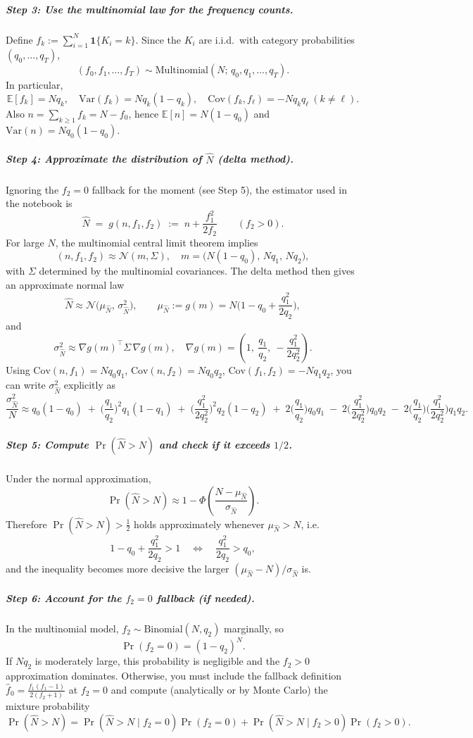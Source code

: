 \documentclass[11pt]{article}
\begin{document}
\subparagraph{Step 3: Use the multinomial law for the frequency counts.}
Define $f_k:=\sum_{i=1}^N \mathbf{1}\{K_i=k\}$. Since the $K_i$ are i.i.d.\ with category probabilities $(q_0,\dots,q_T)$,
\[
(f_0,f_1,\dots,f_T)\sim \mathrm{Multinomial}\!\left(N;\,q_0,q_1,\dots,q_T\right).
\]
In particular,
\[
\mathbb{E}[f_k]=Nq_k,\quad
\mathrm{Var}(f_k)=Nq_k(1-q_k),\quad
\mathrm{Cov}(f_k,f_\ell)=-Nq_kq_\ell\ (k\neq \ell).
\]
Also $n=\sum_{k\ge 1} f_k = N-f_0$, hence $\mathbb{E}[n]=N(1-q_0)$ and $\mathrm{Var}(n)=Nq_0(1-q_0)$.

\subparagraph{Step 4: Approximate the distribution of $\hat N$ (delta method).}
Ignoring the $f_2=0$ fallback for the moment (see Step 5), the estimator used in the notebook is
\[
\hat N \;=\; g(n,f_1,f_2)
\;:=\;
n+\frac{f_1^2}{2f_2}\qquad(f_2>0).
\]
For large $N$, the multinomial central limit theorem implies
\[
(n,f_1,f_2)\approx \mathcal N(m,\Sigma),
\quad
m=\big(N(1-q_0),\,Nq_1,\,Nq_2\big),
\]
with $\Sigma$ determined by the multinomial covariances. The delta method then gives an approximate normal law
\[
\hat N \approx \mathcal N\!\big(\mu_{\hat N},\,\sigma_{\hat N}^2\big),
\qquad
\mu_{\hat N}:=g(m)=N\Big(1-q_0+\frac{q_1^2}{2q_2}\Big),
\]
and
\[
\sigma_{\hat N}^2 \approx \nabla g(m)^\top \Sigma\,\nabla g(m),
\quad
\nabla g(m)=\left(1,\ \frac{q_1}{q_2},\ -\frac{q_1^2}{2q_2^2}\right).
\]
Using $\mathrm{Cov}(n,f_1)=Nq_0q_1$, $\mathrm{Cov}(n,f_2)=Nq_0q_2$, $\mathrm{Cov}(f_1,f_2)=-Nq_1q_2$, you can write $\sigma_{\hat N}^2$ explicitly as
\[
\frac{\sigma_{\hat N}^2}{N}\approx
q_0(1-q_0)
\;+\;\Big(\frac{q_1}{q_2}\Big)^2 q_1(1-q_1)
\;+\;\Big(\frac{q_1^2}{2q_2^2}\Big)^2 q_2(1-q_2)
\;+\;2\Big(\frac{q_1}{q_2}\Big)q_0q_1
\;-\;2\Big(\frac{q_1^2}{2q_2^2}\Big)q_0q_2
\;-\;2\Big(\frac{q_1}{q_2}\Big)\Big(\frac{q_1^2}{2q_2^2}\Big)q_1q_2.
\]

\subparagraph{Step 5: Compute $\Pr(\hat N>N)$ and check if it exceeds $1/2$.}
Under the normal approximation,
\[
\Pr(\hat N > N)\approx 1-\Phi\!\left(\frac{N-\mu_{\hat N}}{\sigma_{\hat N}}\right).
\]
Therefore \(\Pr(\hat N>N)>\tfrac12\) holds approximately whenever \(\mu_{\hat N}>N\), i.e.
\[
1-q_0+\frac{q_1^2}{2q_2} > 1
\quad\Longleftrightarrow\quad
\frac{q_1^2}{2q_2} > q_0,
\]
and the inequality becomes more decisive the larger \((\mu_{\hat N}-N)/\sigma_{\hat N}\) is.

\subparagraph{Step 6: Account for the $f_2=0$ fallback (if needed).}
In the multinomial model, $f_2\sim \mathrm{Binomial}(N,q_2)$ marginally, so
\[
\Pr(f_2=0)=(1-q_2)^N.
\]
If $Nq_2$ is moderately large, this probability is negligible and the $f_2>0$ approximation dominates. Otherwise, you must include the fallback definition
\(\hat f_0=\frac{f_1(f_1-1)}{2(f_2+1)}\) at $f_2=0$ and compute (analytically or by Monte Carlo) the mixture probability
\[
\Pr(\hat N>N)=\Pr(\hat N>N\mid f_2=0)\Pr(f_2=0)+\Pr(\hat N>N\mid f_2>0)\Pr(f_2>0).
\]
\end{document}
